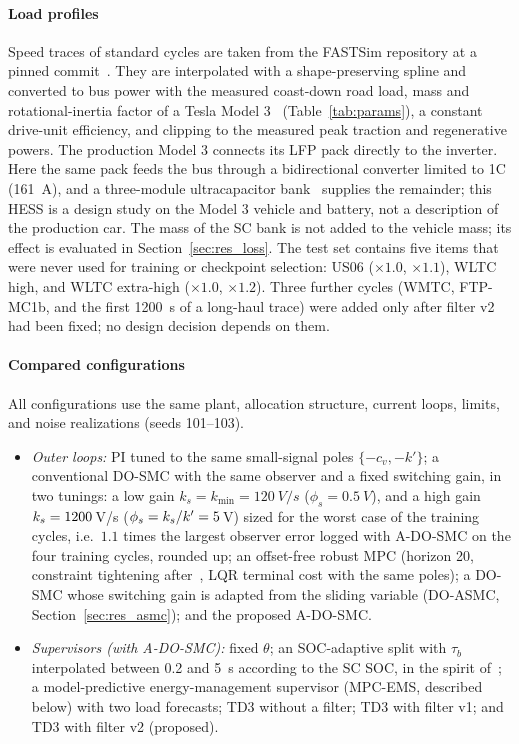 \paragraph{Load profiles}
Speed traces of standard cycles are taken from the FASTSim repository at a pinned commit~\cite{brooker2015fastsim,fastsimrepo}. They are interpolated with a shape-preserving spline and converted to bus power with the measured coast-down road load, mass and rotational-inertia factor of a Tesla Model 3~\cite{rosenberger2024m3} (Table~\ref{tab:params}), a constant drive-unit efficiency, and clipping to the measured peak traction and regenerative powers. The production Model 3 connects its LFP pack directly to the inverter. Here the same pack feeds the bus through a bidirectional converter limited to 1C (\SI{161}{A}), and a three-module ultracapacitor bank~\cite{maxwell125v} supplies the remainder; this HESS is a design study on the Model 3 vehicle and battery, not a description of the production car. The mass of the SC bank is not added to the vehicle mass; its effect is evaluated in Section~\ref{sec:res_loss}. The test set contains five items that were never used for training or checkpoint selection: US06 ($\times1.0$, $\times1.1$), WLTC high, and WLTC extra-high ($\times1.0$, $\times1.2$). Three further cycles (WMTC, FTP-MC1b, and the first \SI{1200}{s} of a long-haul trace) were added only after filter v2 had been fixed; no design decision depends on them.

\paragraph{Compared configurations}
All configurations use the same plant, allocation structure, current loops, limits, and noise realizations (seeds 101--103).
\begin{itemize}
\item \emph{Outer loops:} PI tuned to the same small-signal poles $\{-c_v,-k'\}$; a conventional DO-SMC with the same observer and a fixed switching gain, in two tunings: a low gain $k_s=k_{\min}=\SI{120}{V/s}$ ($\phi_s=\SI{0.5}{V}$), and a high gain $k_s=1200$\,V/s ($\phi_s=k_s/k'=5$\,V) sized for the worst case of the training cycles, i.e.\ $1.1$ times the largest observer error logged with A-DO-SMC on the four training cycles, rounded up; an offset-free robust MPC (horizon 20, constraint tightening after~\cite{chisci2001}, LQR terminal cost with the same poles); a DO-SMC whose switching gain is adapted from the sliding variable (DO-ASMC, Section~\ref{sec:res_asmc}); and the proposed A-DO-SMC.
\item \emph{Supervisors (with A-DO-SMC):} fixed $\theta$; an SOC-adaptive split with $\tau_b$ interpolated between 0.2 and \SI{5}{s} according to the SC SOC, in the spirit of~\cite{nguyen2021adaptive}; a model-predictive energy-management supervisor (MPC-EMS, described below) with two load forecasts; TD3 without a filter; TD3 with filter v1; and TD3 with filter v2 (proposed).
\end{itemize}

